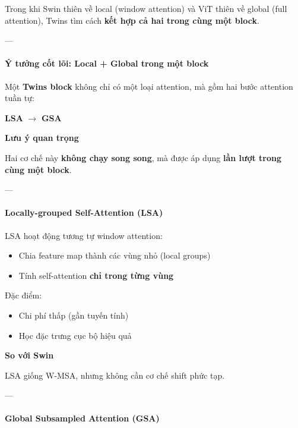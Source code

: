 Trong khi Swin thiên về local (window attention) và ViT thiên về global (full attention), Twins tìm cách \textbf{kết hợp cả hai trong cùng một block}.

---

\paragraph{Ý tưởng cốt lõi: Local + Global trong một block}

Một \textbf{Twins block} không chỉ có một loại attention, mà gồm hai bước attention tuần tự:

\begin{center}
	\textbf{LSA} $\rightarrow$ \textbf{GSA}
\end{center}

\begin{mdframed}[style=infobox]
	\textbf{Lưu ý quan trọng}
	
	Hai cơ chế này \textbf{không chạy song song}, mà được áp dụng \textbf{lần lượt trong cùng một block}.
\end{mdframed}

---

\paragraph{Locally-grouped Self-Attention (LSA)}

LSA hoạt động tương tự window attention:

\begin{itemize}
	\item Chia feature map thành các vùng nhỏ (local groups)
	\item Tính self-attention \textbf{chỉ trong từng vùng}
\end{itemize}

Đặc điểm:
\begin{itemize}
	\item Chi phí thấp (gần tuyến tính)
	\item Học đặc trưng cục bộ hiệu quả
\end{itemize}

\begin{mdframed}[style=infobox]
	\textbf{So với Swin}
	
	LSA giống W-MSA, nhưng không cần cơ chế shift phức tạp.
\end{mdframed}

---

\paragraph{Global Subsampled Attention (GSA)}

